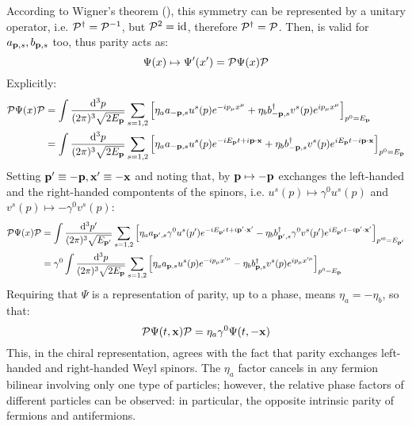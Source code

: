 According to Wigner's theorem (), this symmetry can be represented by a unitary operator, i.e. $ \mathcal{P}^\dagger = \mathcal{P}^{-1} $, but $ \mathcal{P}^2 = \operatorname{id} $, therefore $ \mathcal{P}^\dagger = \mathcal{P} $. Then,  is valid for $ a_{\mathbf{p},s} , b_{\mathbf{p},s} $ too, thus parity acts as:
\begin{equation}
  \Psi(x) \mapsto \Psi'(x') = \mathcal{P} \Psi(x) \mathcal{P}
\end{equation}
Explicitly:
\begin{equation*}
  \begin{split}
    \mathcal{P} \Psi(x) \mathcal{P}
    &= \int \frac{\mathrm{d}^3p}{(2\pi)^3 \sqrt{2E_{\mathbf{p}}}} \sum_{s = 1,2} \left[ \eta_a a_{-\mathbf{p},s} u^s(p) e^{-i p_\mu x^\mu} + \eta_b b_{-\mathbf{p},s}^\dagger v^s(p) e^{i p_\mu x^\mu} \right]_{p^0 = E_{\mathbf{p}}} \\
    &= \int \frac{\mathrm{d}^3p}{(2\pi)^3 \sqrt{2E_{\mathbf{p}}}} \sum_{s = 1,2} \left[ \eta_a a_{-\mathbf{p},s} u^s(p) e^{-i E_{\mathbf{p}} t + i \mathbf{p} \cdot \mathbf{x}} + \eta_b b_{-\mathbf{p},s}^\dagger v^s(p) e^{i E_{\mathbf{p}} t - i \mathbf{p} \cdot \mathbf{x}} \right]_{p^0 = E_{\mathbf{p}}} \\
  \end{split}
\end{equation*}
Setting $ \mathbf{p}' \equiv - \mathbf{p} , \mathbf{x}' \equiv -\mathbf{x} $ and noting that, by  $ \mathbf{p} \mapsto -\mathbf{p} $ exchanges the left-handed and the right-handed compontents of the spinors, i.e. $ u^s(p) \mapsto \gamma^0 u^s(p) $ and $ v^s(p) \mapsto - \gamma^0 v^s(p) $:
\begin{equation*}
  \begin{split}
    \mathcal{P} \Psi(x) \mathcal{P}
    &= \int \frac{\mathrm{d}^3p'}{(2\pi)^3 \sqrt{E_{\mathbf{p}'}}} \sum_{s = 1,2} \left[ \eta_a a_{\mathbf{p}',s} \gamma^0 u^s(p') e^{-i E_{\mathbf{p}'} t + i \mathbf{p}' \cdot \mathbf{x}'} - \eta_b b_{\mathbf{p}',s}^\dagger \gamma^0 v^s(p') e^{i E_{\mathbf{p}'} t - i \mathbf{p}' \cdot \mathbf{x}'} \right]_{p'^0 = E_{\mathbf{p}'}} \\
    &= \gamma^0 \int \frac{\mathrm{d}^3p}{(2\pi)^3 \sqrt{2E_{\mathbf{p}}}} \sum_{s = 1,2} \left[ \eta_a a_{\mathbf{p},s} u^s(p) e^{-i p_\mu x'^\mu} - \eta_b b_{\mathbf{p},s}^\dagger v^s(p) e^{i p_\mu x'^\mu} \right]_{p^0 = E_{\mathbf{p}}}
  \end{split}
\end{equation*}
Requiring that $ \Psi $ is a representation of parity, up to a phase, means $ \eta_a = - \eta_b $, so that:
\begin{equation}
  \mathcal{P} \Psi(t,\mathbf{x}) \mathcal{P} = \eta_a \gamma^0 \Psi(t,-\mathbf{x})
\end{equation}
This, in the chiral representation, agrees with the fact that parity exchanges left-handed and right-handed Weyl spinors. The $ \eta_a $ factor cancels in any fermion bilinear involving only one type of particles; however, the relative phase factors of different particles can be observed: in particular, the opposite intrinsic parity of fermions and antifermions.

